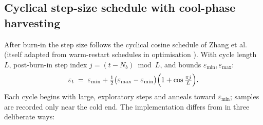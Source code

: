 \documentclass[11pt]{article}
\begin{document}
\subsection{Cyclical step-size schedule with cool-phase harvesting}
\label{sec:cyclical}

After burn-in the step size follows the cyclical cosine schedule of Zhang et
al.~\cite{zhang2020} (itself adapted from warm-restart schedules in
optimisation \cite{loshchilov2017}).  With cycle length $L$, post-burn-in
step index $j = (t - N_b) \bmod L$, and bounds
$\varepsilon_{\min},\varepsilon_{\max}$:
\begin{equation}
  \varepsilon_t \;=\; \varepsilon_{\min}
  + \tfrac{1}{2}\bigl(\varepsilon_{\max} - \varepsilon_{\min}\bigr)
    \Bigl(1 + \cos\tfrac{\pi j}{L}\Bigr).
  \label{eq:cyclical}
\end{equation}
Each cycle begins with large, exploratory steps and anneals toward
$\varepsilon_{\min}$; samples are recorded only near the cold end.  The
implementation differs from \cite{zhang2020} in three deliberate ways:
\end{document}
